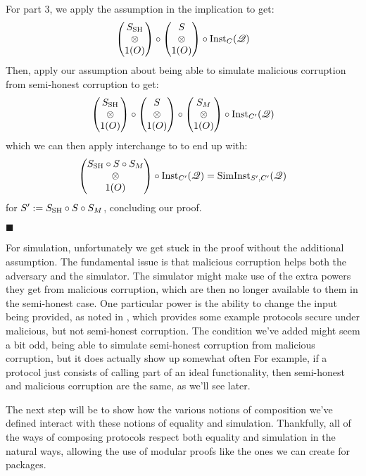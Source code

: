 \begin{theorem}
  For part 3, we apply the assumption in the implication to get:
  $$
  \begin{pmatrix}
    S_{\text{SH}}\cr
    \otimes\cr
    1(O)
  \end{pmatrix}
  \circ
  \begin{pmatrix}
    S\cr
    \otimes\cr
    1(O)
  \end{pmatrix}
  \circ \text{Inst}_{C}(\mathscr{Q})
  $$
  Then, apply our assumption about being able to simulate malicious corruption
  from semi-honest corruption to get:
  $$
  \begin{pmatrix}
    S_{\text{SH}}\cr
    \otimes\cr
    1(O)
  \end{pmatrix}
  \circ
  \begin{pmatrix}
    S\cr
    \otimes\cr
    1(O)
  \end{pmatrix}
  \circ
  \begin{pmatrix}
    S_M\cr
    \otimes\cr
    1(O)
  \end{pmatrix}
  \circ \text{Inst}_{C'}(\mathscr{Q})
  $$
  which we can then apply interchange to to end up with:
  $$
  \begin{pmatrix}
    S_{\text{SH}} \circ S \circ S_M\cr
    \otimes\cr
    1(O)
  \end{pmatrix}
  \circ \text{Inst}_{C'}(\mathscr{Q})
  = \text{SimInst}_{S', C'}(\mathscr{Q})
  $$
  for $S' := S_{\text{SH}} \circ S \circ S_M$, concluding our proof.

  $\blacksquare$
\end{theorem}

For simulation, unfortunately we get stuck in the proof without the additional
assumption.
The fundamental issue is that malicious corruption helps both
the adversary and the simulator.
The simulator might make use of the extra powers they get
from malicious corruption, which are then no longer available
to them in the semi-honest case.
One particular power is the ability to change the input being
provided, as noted in
\cite{EPRINT:HazLin10a}, which provides
some example protocols secure under malicious, but not semi-honest corruption.
The condition we've added might seem a bit odd, being able to simulate
semi-honest corruption from malicious corruption,
but it does actually show up somewhat often
For example, if a protocol just consists of calling part of an ideal
functionality, then semi-honest and malicious corruption
are the same, as we'll see later.

The next step will be to show how the various notions of composition
we've defined interact with these notions of equality and simulation.
Thankfully, all of the ways of composing protocols
respect both equality and simulation in the natural ways,
allowing the use of modular proofs like the ones we can create
for packages.

